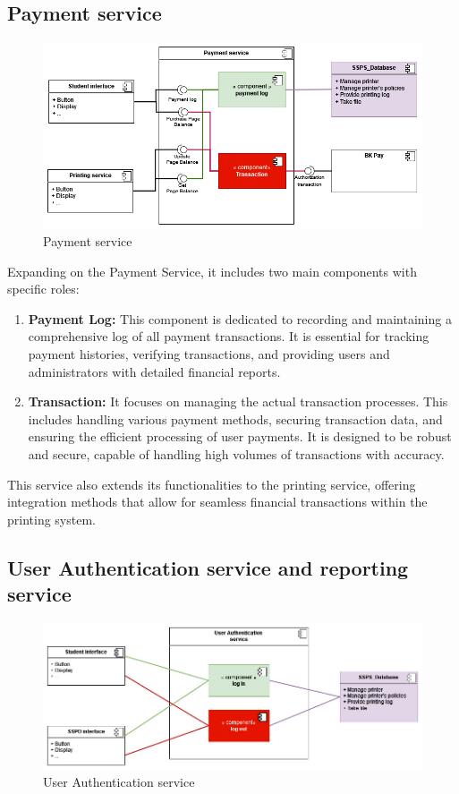 \subsection{Payment service}
\begin{figure}[H]
\includegraphics[max width = 0.9\linewidth,origin = c]{chapters/6. architecture-design/Component Diagram/payment.png}
  \caption{Payment service}%
  \end{figure}
Expanding on the Payment Service, it includes two main components with specific roles:
\begin{enumerate}
    \item \textbf{Payment Log:} This component is dedicated to recording and maintaining a comprehensive log of all payment transactions. It is essential for tracking payment histories, verifying transactions, and providing users and administrators with detailed financial reports.
    \item \textbf{Transaction:} It focuses on managing the actual transaction processes. This includes handling various payment methods, securing transaction data, and ensuring the efficient processing of user payments. It is designed to be robust and secure, capable of handling high volumes of transactions with accuracy.
\end{enumerate}
This service also extends its functionalities to the printing service, offering integration methods that allow for seamless financial transactions within the printing system.



\subsection{User Authentication service and reporting service}
\begin{figure}[H]
    \includegraphics[max width = 0.9\linewidth,origin = c]{chapters/6. architecture-design/Component Diagram/Login.jpg}
    \caption{User Authentication service}%
\end{figure}

